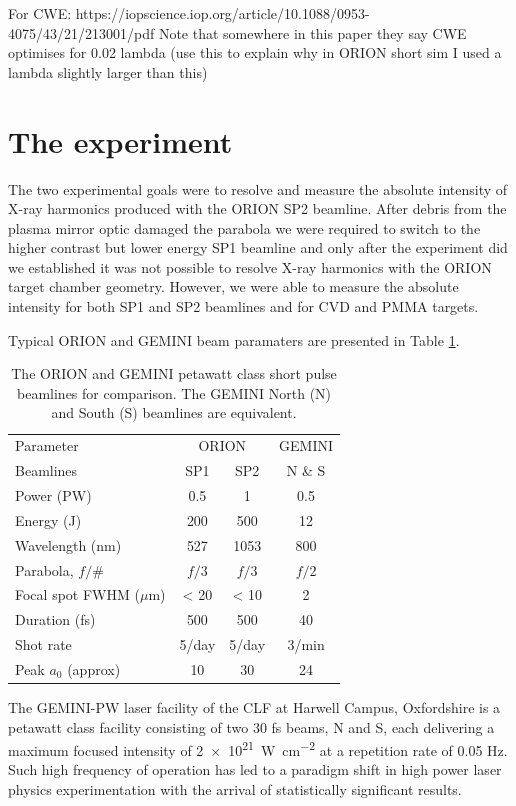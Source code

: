 For CWE: https://iopscience.iop.org/article/10.1088/0953-4075/43/21/213001/pdf
Note that somewhere in this paper they say CWE optimises for 0.02 lambda (use this to explain why in ORION short sim I used a lambda slightly larger than this)


\section{The experiment}
The two experimental goals were to resolve and measure the absolute intensity of X-ray harmonics produced with the ORION SP2 beamline. After debris from the plasma mirror optic damaged the parabola we were required to switch to the higher contrast but lower energy SP1 beamline and only after the experiment did we established it was not possible to resolve X-ray harmonics with the ORION target chamber geometry. However, we were able to measure the absolute intensity for both SP1 and SP2 beamlines and for CVD and PMMA targets.

Typical ORION and GEMINI beam paramaters are presented in Table \ref{tab:laser_params}.
\begin{table}[]
	\centering
	\begin{tabular}{lccc}
		\hline \hline
		Parameter                & \multicolumn{2}{c}{ORION} & GEMINI \\ 
		Beamlines                & SP1         & SP2         & N \& S  \\ \hline
		Power (PW)               & 0.5         & 1           & 0.5    \\
		Energy (J)               & 200         & 500         & 12     \\
		Wavelength (nm)          & 527         & 1053        & 800    \\
		Parabola, $f/\#$ & $f/3$        & $f/3$        & $f/2$      \\
		Focal spot FWHM ($\mu$m) & < 20        & < 10        & 2      \\
		Duration (fs)            & 500         & 500         & 40     \\
		Shot rate                & 5/day       & 5/day       & 3/min  \\
		Peak $a_0$ (approx)      & 10          & 30          & 24    \\ \hline \hline
	\end{tabular}
	\caption{The ORION and GEMINI petawatt class short pulse beamlines for comparison. The GEMINI North (N) and South (S) beamlines are equivalent.}
	\label{tab:laser_params}
\end{table}
The GEMINI-PW laser facility of the \ac{CLF} at Harwell Campus, Oxfordshire is a petawatt class facility consisting of two 30 fs beams, \ac{N} and \ac{S}, each delivering a maximum focused intensity of \qty{2e21}{W.cm^{-2}} at a repetition rate of 0.05 Hz. Such high frequency of operation has led to a paradigm shift in high power laser physics experimentation with the arrival of statistically significant results.

